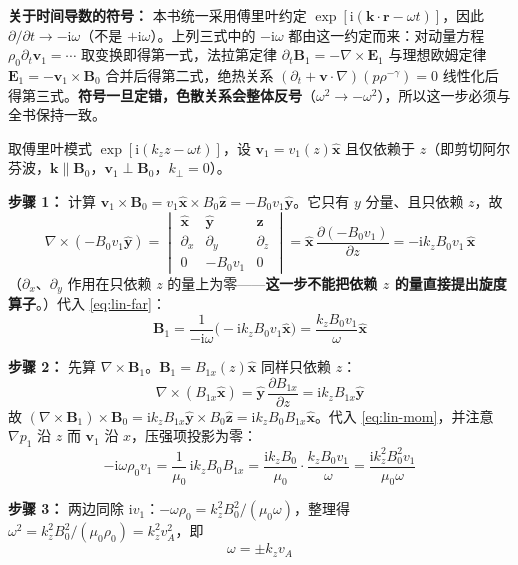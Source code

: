 \documentclass[12pt,a4paper,openany,oneside]{book}
\newcommand{\ii}{\mathrm{i}}
\newcommand{\vect}[1]{\bm{#1}}
\newcommand{\unitvec}[1]{\hat{\vect{#1}}}
\newcommand{\grad}{\nabla}
\newcommand{\curl}{\nabla\times}
\begin{document}
\textbf{关于时间导数的符号：} 本书统一采用傅里叶约定 $\exp[\ii(\vect{k}\cdot\vect{r}-\omega t)]$，因此 $\partial/\partial t\to-\ii\omega$（不是 $+\ii\omega$）。上列三式中的 $-\ii\omega$ 都由这一约定而来：对动量方程 $\rho_0\partial_t\vect{v}_1=\cdots$ 取变换即得第一式，法拉第定律 $\partial_t\vect{B}_1=-\curl\vect{E}_1$ 与理想欧姆定律 $\vect{E}_1=-\vect{v}_1\times\vect{B}_0$ 合并后得第二式，绝热关系 $(\partial_t+\vect{v}\cdot\grad)(p\rho^{-\gamma})=0$ 线性化后得第三式。\textbf{符号一旦定错，色散关系会整体反号}（$\omega^2\to-\omega^2$），所以这一步必须与全书保持一致。

取傅里叶模式 $\exp[\ii(k_z z - \omega t)]$，设 $\vect{v}_1 = v_1(z)\unitvec{x}$ 且仅依赖于 $z$（即剪切阿尔芬波，$\vect{k}\parallel\vect{B}_0$，$\vect{v}_1\perp\vect{B}_0$，$k_\perp=0$）。

\textbf{步骤 1：} 计算 $\vect{v}_1\times\vect{B}_0 = v_1\unitvec{x}\times B_0\unitvec{z} = -B_0v_1\unitvec{y}$。它只有 $y$ 分量、且只依赖 $z$，故
\[
\curl(-B_0v_1\unitvec{y}) = \begin{vmatrix}\unitvec{x}&\unitvec{y}&\unitvec{z}\\ \partial_x&\partial_y&\partial_z\\ 0&-B_0v_1&0\end{vmatrix}
= \unitvec{x}\,\frac{\partial(-B_0v_1)}{\partial z} = -\ii k_z B_0v_1\,\unitvec{x}
\]
（$\partial_x$、$\partial_y$ 作用在只依赖 $z$ 的量上为零——\textbf{这一步不能把依赖 $z$ 的量直接提出旋度算子}。）代入 \eqref{eq:lin-far}：
\begin{equation}
\vect{B}_1 = \frac{1}{-\ii\omega}\bigl(-\ii k_z B_0v_1\unitvec{x}\bigr) = \frac{k_z B_0 v_1}{\omega}\unitvec{x}
\label{eq:ch9-alfven-b1}
\end{equation}

\textbf{步骤 2：} 先算 $\curl\vect{B}_1$。$\vect{B}_1=B_{1x}(z)\unitvec{x}$ 同样只依赖 $z$：
\[
\curl(B_{1x}\unitvec{x}) = \unitvec{y}\,\frac{\partial B_{1x}}{\partial z} = \ii k_z B_{1x}\unitvec{y}
\]
故 $(\curl\vect{B}_1)\times\vect{B}_0 = \ii k_z B_{1x}\unitvec{y}\times B_0\unitvec{z} = \ii k_z B_0 B_{1x}\unitvec{x}$。代入 \eqref{eq:lin-mom}，并注意 $\grad p_1$ 沿 $z$ 而 $\vect{v}_1$ 沿 $x$，压强项投影为零：
\begin{equation}
-\ii\omega\rho_0 v_1 = \frac{1}{\mu_0}\,\ii k_z B_0 B_{1x}
= \frac{\ii k_z B_0}{\mu_0}\cdot\frac{k_z B_0 v_1}{\omega}
= \frac{\ii k_z^2 B_0^2 v_1}{\mu_0\omega}
\label{eq:ch9-alfven-momentum}
\end{equation}

\textbf{步骤 3：} 两边同除 $\ii v_1$：$-\omega\rho_0 = k_z^2B_0^2/(\mu_0\omega)$，整理得 $\omega^2 = k_z^2 B_0^2/(\mu_0\rho_0) = k_z^2 v_A^2$，即
\begin{equation}
\boxed{\omega = \pm k_z v_A}
\label{eq:ch9-alfven-dispersion}
\end{equation}
\end{document}
